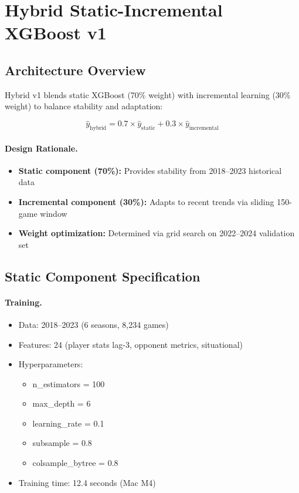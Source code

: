 \section{Hybrid Static-Incremental XGBoost v1}
\label{sec:hybrid-xgb-v1}

\subsection{Architecture Overview}

Hybrid v1 blends static XGBoost (70\% weight) with incremental learning (30\% weight) to balance stability and adaptation:

\begin{equation}
\label{eq:hybrid-prediction}
\hat{y}_{\text{hybrid}} = 0.7 \times \hat{y}_{\text{static}} + 0.3 \times \hat{y}_{\text{incremental}}
\end{equation}

\paragraph{Design Rationale.}
\begin{itemize}[itemsep=2pt,parsep=0pt]
    \item \textbf{Static component (70\%):} Provides stability from 2018--2023 historical data
    \item \textbf{Incremental component (30\%):} Adapts to recent trends via sliding 150-game window
    \item \textbf{Weight optimization:} Determined via grid search on 2022--2024 validation set
\end{itemize}

\subsection{Static Component Specification}

\paragraph{Training.}
\begin{itemize}[itemsep=1pt,parsep=0pt]
    \item Data: 2018--2023 (6 seasons, 8,234 games)
    \item Features: 24 (player stats lag-3, opponent metrics, situational)
    \item Hyperparameters:
    \begin{itemize}[itemsep=0pt]
        \item n\_estimators = 100
        \item max\_depth = 6
        \item learning\_rate = 0.1
        \item subsample = 0.8
        \item colsample\_bytree = 0.8
    \end{itemize}
    \item Training time: 12.4 seconds (Mac M4)
\end{itemize}

